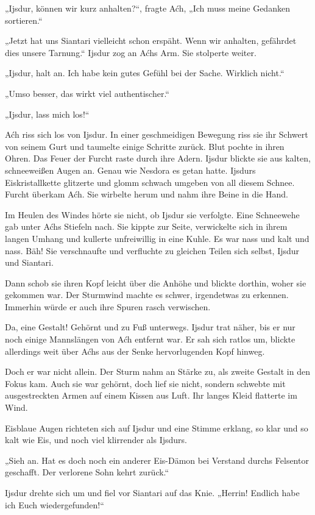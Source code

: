 „Ijsdur, können wir kurz anhalten?“, fragte Aćh, „Ich muss meine Gedanken sortieren.“

„Jetzt hat uns Siantari vielleicht schon erspäht. Wenn wir anhalten, gefährdet dies unsere Tarnung.“ Ijsdur zog an Aćhs Arm. Sie stolperte weiter.

„Ijsdur, halt an. Ich habe kein gutes Gefühl bei der Sache. Wirklich nicht.“

„Umso besser, das wirkt viel authentischer.“

„Ijsdur, lass mich los!“

Aćh riss sich los von Ijsdur. In einer geschmeidigen Bewegung riss sie ihr Schwert von seinem Gurt und taumelte einige Schritte zurück. Blut pochte in ihren Ohren. Das Feuer der Furcht raste durch ihre Adern. Ijsdur blickte sie aus kalten, schneeweißen Augen an. Genau wie Nesdora es getan hatte. Ijsdurs Eiskristallkette glitzerte und glomm schwach umgeben von all diesem Schnee. Furcht überkam Aćh. Sie wirbelte herum und nahm ihre Beine in die Hand.

Im Heulen des Windes hörte sie nicht, ob Ijsdur sie verfolgte. Eine Schneewehe gab unter Aćhs Stiefeln nach. Sie kippte zur Seite, verwickelte sich in ihrem langen Umhang und kullerte unfreiwillig in eine Kuhle. Es war nass und kalt und nass. Bäh! Sie verschnaufte und verfluchte zu gleichen Teilen sich selbst, Ijsdur und Siantari.

Dann schob sie ihren Kopf leicht über die Anhöhe und blickte dorthin, woher sie gekommen war. Der Sturmwind machte es schwer, irgendetwas zu erkennen. Immerhin würde er auch ihre Spuren rasch verwischen.

Da, eine Gestalt! Gehörnt und zu Fuß unterwegs. Ijsdur trat näher, bis er nur noch einige Mannslängen von Aćh entfernt war. Er sah sich ratlos um, blickte allerdings weit über Aćhs aus der Senke hervorlugenden Kopf hinweg.

Doch er war nicht allein. Der Sturm nahm an Stärke zu, als zweite Gestalt in den Fokus kam. Auch sie war gehörnt, doch lief sie nicht, sondern schwebte mit ausgestreckten Armen auf einem Kissen aus Luft. Ihr langes Kleid flatterte im Wind.

Eisblaue Augen richteten sich auf Ijsdur und eine Stimme erklang, so klar und so kalt wie Eis, und noch viel klirrender als Ijsdurs.

„Sieh an. Hat es doch noch ein anderer Eis-Dämon bei Verstand durchs Felsentor geschafft. Der verlorene Sohn kehrt zurück.“

Ijsdur drehte sich um und fiel vor Siantari auf das Knie. „Herrin! Endlich habe ich Euch wiedergefunden!“














